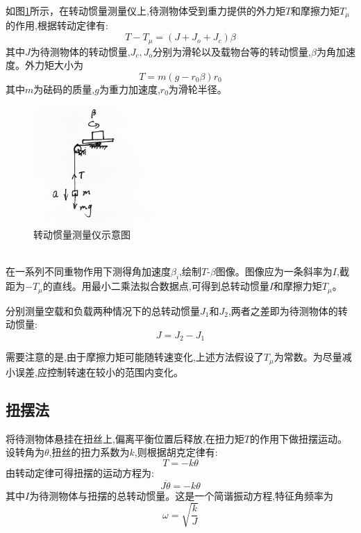 \documentclass[UTF8]{ctexart}
\begin{document}
    如图\ref{fig:1}所示，在转动惯量测量仪上,待测物体受到重力提供的外力矩$T$和摩擦力矩$T_\mu$的作用,根据转动定律有:
    \begin{equation}
    T-T_\mu=(J+J_o+J_c)\beta \label{eq:5}
    \end{equation}
    其中$J$为待测物体的转动惯量,$J_c,J_o$分别为滑轮以及载物台等的转动惯量,$\beta$为角加速度。外力矩大小为
    \begin{equation}
    T=m(g-r_0 \beta )r_0 \label{eq:6}
    \end{equation}
    其中$m$为砝码的质量,$g$为重力加速度,$r_0$为滑轮半径。
    \\
    \begin{figure}[htbp]
        \centering
        \includegraphics[width=0.4\textwidth]{rotating_platform.jpg}
        \caption{转动惯量测量仪示意图}
        \label{fig:1}
    \end{figure}
    \\
    在一系列不同重物作用下测得角加速度$\beta_i$,绘制$T$-$\beta$图像。图像应为一条斜率为$I$,截距为$-T_\mu$的直线。用最小二乘法拟合数据点,可得到总转动惯量$I$和摩擦力矩$T_\mu$。
    
    分别测量空载和负载两种情况下的总转动惯量$J_1$和$J_2$,两者之差即为待测物体的转动惯量:
    \begin{equation}
    J=J_2-J_1 \label{eq:7}  
    \end{equation}
    
    需要注意的是,由于摩擦力矩可能随转速变化,上述方法假设了$T_\mu$为常数。为尽量减小误差,应控制转速在较小的范围内变化。
    

    

    \subsection{扭摆法}
    
    将待测物体悬挂在扭丝上,偏离平衡位置后释放,在扭力矩$T$的作用下做扭摆运动。设转角为$\theta$,扭丝的扭力系数为$k$,则根据胡克定律有:
    \begin{equation}
    T=-k\theta \label{eq:8}
    \end{equation}
    由转动定律可得扭摆的运动方程为:
    \begin{equation}
    J\ddot{\theta}=-k\theta \label{eq:9}
    \end{equation}
    其中$I$为待测物体与扭摆的总转动惯量。这是一个简谐振动方程,特征角频率为
    \begin{equation}
    \omega=\sqrt{\frac{k}{J}} \label{eq:10}  
    \end{equation}
    
\end{document}
